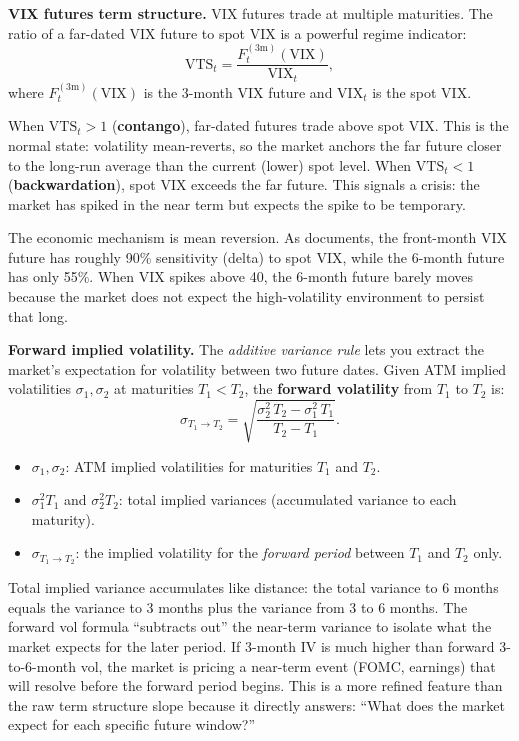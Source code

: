 \textbf{VIX futures term structure.}
VIX futures trade at multiple maturities.
The ratio of a far-dated VIX future to spot VIX is a powerful regime indicator:
\begin{equation}\label{eq:vix-ts-ratio}
\text{VTS}_t = \frac{F_t^{(3\text{m})}(\text{VIX})}{\text{VIX}_t},
\end{equation}
where $F_t^{(3\text{m})}(\text{VIX})$ is the 3-month VIX future and $\text{VIX}_t$ is the spot VIX.

When $\text{VTS}_t > 1$ (\textbf{contango}), far-dated futures trade above spot VIX.
This is the normal state: volatility mean-reverts, so the market anchors the far future closer to the long-run average than the current (lower) spot level.
When $\text{VTS}_t < 1$ (\textbf{backwardation}), spot VIX exceeds the far future.
This signals a crisis: the market has spiked in the near term but expects the spike to be temporary.

The economic mechanism is mean reversion.
As \citet{Bennett2014} documents, the front-month VIX future has roughly 90\% sensitivity (delta) to spot VIX, while the 6-month future has only 55\%.
When VIX spikes above 40, the 6-month future barely moves because the market does not expect the high-volatility environment to persist that long.

\textbf{Forward implied volatility.}
The \emph{additive variance rule} lets you extract the market's expectation for volatility between two future dates.
Given ATM implied volatilities $\sigma_1, \sigma_2$ at maturities $T_1 < T_2$, the \textbf{forward volatility} from $T_1$ to $T_2$ is:
\begin{equation}\label{eq:forward-vol}
\sigma_{T_1 \to T_2} = \sqrt{\frac{\sigma_2^2\,T_2 - \sigma_1^2\,T_1}{T_2 - T_1}}.
\end{equation}
\begin{itemize}[nosep]
  \item $\sigma_1, \sigma_2$: ATM implied volatilities for maturities $T_1$ and $T_2$.
  \item $\sigma_1^2 T_1$ and $\sigma_2^2 T_2$: total implied variances (accumulated variance to each maturity).
  \item $\sigma_{T_1 \to T_2}$: the implied volatility for the \emph{forward period} between $T_1$ and $T_2$ only.
\end{itemize}

\begin{intuition}
Total implied variance accumulates like distance: the total variance to 6 months equals the variance to 3 months plus the variance from 3 to 6 months.
The forward vol formula ``subtracts out'' the near-term variance to isolate what the market expects for the later period.
If 3-month IV is much higher than forward 3-to-6-month vol, the market is pricing a near-term event (FOMC, earnings) that will resolve before the forward period begins.
This is a more refined feature than the raw term structure slope because it directly answers: ``What does the market expect for each specific future window?''
\end{intuition}

